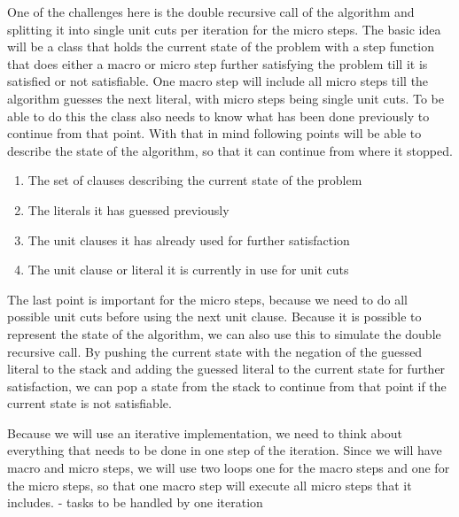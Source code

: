 One of the challenges here is the double recursive call of the algorithm and splitting it into single unit cuts per iteration for the micro steps. The basic idea will be a class that holds the current state of the problem with a step function that does either a macro or micro step further satisfying the problem till it is satisfied or not satisfiable. One macro step will include all micro steps till the algorithm guesses the next literal, with micro steps being single unit cuts. To be able to do this the class also needs to know what has been done previously to continue from that point. With that in mind following points will be able to describe the state of the algorithm, so that it can continue from where it stopped.

\begin{enumerate}
    \item The set of clauses describing the current state of the problem
    \item The literals it has guessed previously
    \item The unit clauses it has already used for further satisfaction
    \item The unit clause or literal it is currently in use for unit cuts
\end{enumerate}

The last point is important for the micro steps, because we need to do all possible unit cuts before using the next unit clause. Because it is possible to represent the state of the algorithm, we can also use this to simulate the double recursive call. By pushing the current state with the negation of the guessed literal to the stack and adding the guessed literal to the current state for further satisfaction, we can pop a state from the stack to continue from that point if the current state is not satisfiable.

Because we will use an iterative implementation, we need to think about everything that needs to be done in one step of the iteration. Since we will have macro and micro steps, we will use two loops one for the macro steps and one for the micro steps, so that one macro step will execute all micro steps that it includes.
- tasks to be handled by one iteration

